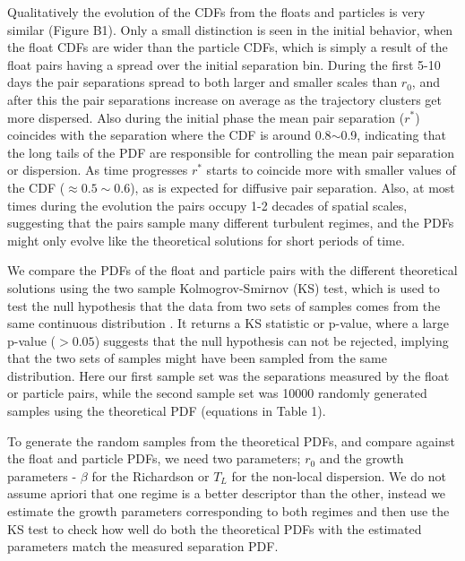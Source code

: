 \documentclass[]{ametsoc}
\begin{document}
Qualitatively the evolution of the CDFs from the floats and particles is very similar (Figure B1). Only a small distinction is seen in the initial behavior, when the float CDFs are wider than the particle CDFs, which is simply a result of the float pairs having a spread over the initial separation bin.
During the first 5-10 days the pair separations spread to both larger and smaller scales than $r_0$, and after this the pair separations increase on average as the trajectory clusters get more dispersed. Also during the initial phase the mean pair separation ($r^*$) coincides with the separation where the CDF is around 0.8$\sim$0.9, indicating that the long tails of the PDF are responsible for controlling the mean pair separation or dispersion. As time progresses $r^*$ starts to coincide more with smaller values of the CDF ($\approx 0.5\sim0.6$), as is expected for diffusive pair separation. Also, at most times during the evolution the pairs occupy 1-2 decades of spatial scales, suggesting that the pairs sample many different turbulent regimes, and the PDFs might only evolve like the theoretical solutions for short periods of time.

We compare the PDFs of the float and particle pairs with the different theoretical solutions using the two sample Kolmogrov-Smirnov (KS) test, which is used to test the null hypothesis that the data from two sets of samples comes from the same continuous distribution \citep{berger2014kolmogorov}. It returns a KS statistic or p-value, where a large p-value ($> 0.05$) suggests that the null hypothesis can not be rejected, implying that the two sets of samples might have been sampled from the same distribution. Here our first sample set was the separations measured by the float or particle pairs, while the second sample set was 10000 randomly generated samples using the theoretical PDF (equations in Table 1).

To generate the random samples from the theoretical PDFs, and compare against the float and particle PDFs, we need two parameters; $r_0$ and the growth parameters - $\beta$ for the Richardson or $T_L$ for the non-local dispersion. We do not assume apriori that one regime is a better descriptor than the other, instead we estimate the growth parameters corresponding to both regimes and then use the KS test to check how well do both the theoretical PDFs with the estimated parameters match the measured separation PDF.
\end{document}
